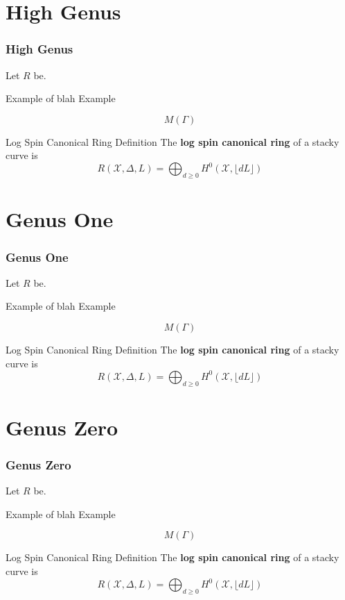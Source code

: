 \documentclass{beamer}
\theoremstyle{remark}
\newcommand \sx{{\mathscr X}}
\newcommand{\halfcan}{L}
\begin{document}
\section{High Genus} 

\begin{frame}
\frametitle{High Genus}
Let $R$ be.

\pause
\begin{exampleblock}{Example of blah}
Example
\end{exampleblock}

\pause
\[
   M(\Gamma)
\]

\pause
\begin{alertblock}{Log Spin Canonical Ring Definition}
The \textbf{log spin canonical ring} of a stacky curve is
\[
	R(\sx, \Delta, \halfcan) = \bigoplus_{d \geq 0} H^0(\sx, \lfloor d \halfcan \rfloor)
\]
\end{alertblock}

\end{frame}

\section{Genus One} 

\begin{frame}
\frametitle{Genus One}
Let $R$ be.

\pause
\begin{exampleblock}{Example of blah}
Example
\end{exampleblock}

\pause
\[
   M(\Gamma)
\]

\pause
\begin{alertblock}{Log Spin Canonical Ring Definition}
The \textbf{log spin canonical ring} of a stacky curve is
\[
	R(\sx, \Delta, \halfcan) = \bigoplus_{d \geq 0} H^0(\sx, \lfloor d \halfcan \rfloor)
\]
\end{alertblock}

\end{frame}

\section{Genus Zero} 

\begin{frame}
\frametitle{Genus Zero}
Let $R$ be.

\pause
\begin{exampleblock}{Example of blah}
Example
\end{exampleblock}

\pause
\[
   M(\Gamma)
\]

\pause
\begin{alertblock}{Log Spin Canonical Ring Definition}
The \textbf{log spin canonical ring} of a stacky curve is
\[
	R(\sx, \Delta, \halfcan) = \bigoplus_{d \geq 0} H^0(\sx, \lfloor d \halfcan \rfloor)
\]
\end{alertblock}

\end{frame}
\end{document}
